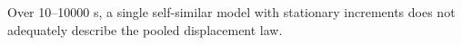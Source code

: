 Over 10--10000 s, a single self-similar model with stationary increments does not adequately describe the pooled displacement law.
